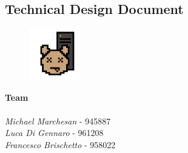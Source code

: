 \begin{titlepage}

\section*{Technical Design Document}


\begin{figure}
	\centering
	\includegraphics[max width=0.2\textwidth]{../Pictures/DH_logo.png}
\end{figure}

\textbf{Team} \\ \\
\textit{Michael Marchesan} - 945887 \\
\textit{Luca Di Gennaro} - 961208 \\
\textit{Francesco Brischetto} - 958022 

\end{titlepage}


